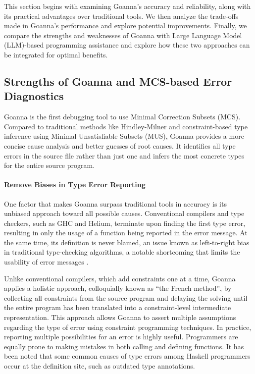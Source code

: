 \documentclass[pdflatex,lineno,sn-nature,Numbered]{sn-jnl}%
\begin{document}
This section begins with examining Goanna's accuracy and reliability, along with its practical advantages over traditional tools. We then analyze the trade-offs made in Goanna's performance and explore potential improvements. Finally, we compare the strengths and weaknesses of Goanna with Large Language Model (LLM)-based programming assistance and explore how these two approaches can be integrated for optimal benefits.

\subsection{Strengths of Goanna and MCS-based Error Diagnostics}

Goanna is the first debugging tool to use Minimal Correction Subsets (MCS). Compared to traditional methods like Hindley-Milner and constraint-based type inference using Minimal Unsatisfiable Subsets (MUS), Goanna provides a more concise cause analysis and better guesses of root causes. It identifies all type errors in the source file rather than just one and infers the most concrete types for the entire source program.

\paragraph{Remove Biases in Type Error Reporting}

One factor that makes Goanna surpass traditional tools in accuracy is its unbiased approach toward all possible causes. Conventional compilers and type checkers, such as GHC and Helium, terminate upon finding the first type error, resulting in only the usage of a function being reported in the error message. At the same time, its definition is never blamed, an issue known as left-to-right bias in traditional type-checking algorithms, a notable shortcoming that limits the usability of error messages \cite{McAdam2002-vb, Lee1998-fx, Chen2014-ev}. 

Unlike conventional compilers, which add constraints one at a time, Goanna applies a holistic approach, colloquially known as ``the French method'', by collecting all constraints from the source program and delaying the solving until the entire program has been translated into a constraint-level intermediate representation. This approach allows Goanna to assert multiple assumptions regarding the type of error using constraint programming techniques. In practice, reporting multiple possibilities for an error is highly useful. Programmers are equally prone to making mistakes in both calling and defining functions. It has been noted that some common causes of type errors among Haskell programmers occur at the definition site, such as outdated type annotations.
\end{document}
